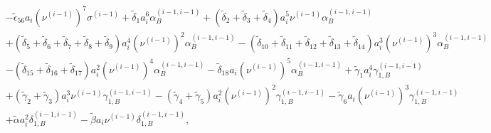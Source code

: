 \documentclass[12pt]{article}
\begin{document}
{\begin{equation}
\begin{aligned}
    & - \tilde{\epsilon}_{56} a_{i} \left( \nu^{(i-1)} \right)^{7} \sigma^{(i-1)} + \tilde{\delta}_{1} a_{i}^{6} \alpha_{B}^{(i-1, i-1)} + \left( \tilde{\delta}_{2} + \tilde{\delta}_{3} + \tilde{\delta}_{4} \right) a_{i}^{5} \nu^{(i-1)} \alpha_{B}^{(i-1, i-1)} \\
    & + \left( \tilde{\delta}_{5} + \tilde{\delta}_{6} + \tilde{\delta}_{7} + \tilde{\delta}_{8} + \tilde{\delta}_{9} \right) a_{i}^{4} \left( \nu^{(i-1)} \right)^{2} \alpha_{B}^{(i-1, i-1)} - \left( \tilde{\delta}_{10} + \tilde{\delta}_{11} + \tilde{\delta}_{12} + \tilde{\delta}_{13} + \tilde{\delta}_{14} \right) a_{i}^{3} \left( \nu^{(i-1)} \right)^{3} \alpha_{B}^{(i-1, i-1)} \\
    & - \left( \tilde{\delta}_{15} + \tilde{\delta}_{16} + \tilde{\delta}_{17} \right) a_{i}^{2} \left( \nu^{(i-1)} \right)^{4} \alpha_{B}^{(i-1, i-1)} - \tilde{\delta}_{18} a_{i} \left( \nu^{(i-1)} \right)^{5} \alpha_{B}^{(i-1, i-1)} + \tilde{\gamma}_{1} a_{i}^{4} \gamma_{1, B}^{(i-1, i-1)} \\
    & + \left( \tilde{\gamma}_{2} + \tilde{\gamma}_{3} \right) a_{i}^{3} \nu^{(i-1)} \gamma_{1, B}^{(i-1, i-1)} - \left( \tilde{\gamma}_{4} + \tilde{\gamma}_{5} \right) a_{i}^{2} \left( \nu^{(i-1)} \right)^{2} \gamma_{1, B}^{(i-1, i-1)} - \tilde{\gamma}_{6} a_{i} \left( \nu^{(i-1)} \right)^{3} \gamma_{1, B}^{(i-1, i-1)} \\
    & + \tilde{\alpha} a_{i}^{2} \delta_{1, B}^{(i-1, i-1)} - \tilde{\beta} a_{i} \nu^{(i-1)} \delta_{1, B}^{(i-1, i-1)},
  \end{aligned}
\end{equation}
}
\end{document}
